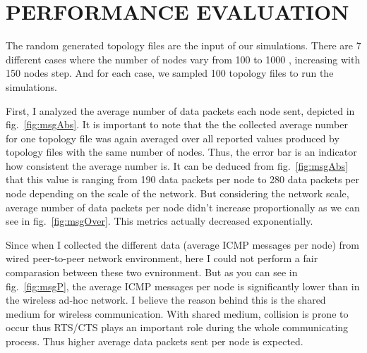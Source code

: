 \chapter{PERFORMANCE EVALUATION}

The random generated topology files are the input of our simulations. There are 7 different cases where the number of nodes vary from 100 to 1000 , increasing with 150 nodes step. And for each case, we sampled 100 topology files to run the simulations.

First, I analyzed the average number of data packets each node sent, depicted in fig.~\ref{fig:msgAbs}. It is important to note that the the collected average number for one topology file was again averaged over all reported values produced by topology files with the same number of nodes. Thus, the error bar is an indicator how consistent the average number is. It can be deduced from fig.~\ref{fig:msgAbs} that this value is ranging from 190 data packets per node to 280 data packets per node depending on the scale of the network. But considering the network scale, average number of data packets per node didn't increase proportionally as we can see in fig.~\ref{fig:msgOver}. This metrics actually decreased exponentially. 

%
%

Since when I collected the different data (average ICMP messages per node) from wired peer-to-peer network environment, here I could not perform a fair comparasion between these two evnironment. But as you can see in fig.~\ref{fig:msgP}, the average ICMP messages per node is significantly lower than in the wireless ad-hoc network. I believe the reason behind this is the shared medium for wireless communication. With shared medium, collision is prone to occur thus RTS/CTS plays an important role during the whole communicating process. Thus higher average data packets sent per node is expected.

